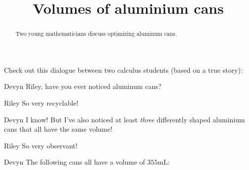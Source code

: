 \documentclass{ximera}
\title[Break-Ground:]{Volumes of aluminium cans}
\begin{document}
\begin{abstract}
Two young mathematicians discuss optimizing aluminum cans.
\end{abstract}
\maketitle

Check out this dialogue between two calculus students (based on a true
story):

\begin{dialogue}
\item[Devyn] Riley, have you ever noticed aluminum cans?
\item[Riley] So very recyclable! 
\item[Devyn] I know! But I've also noticed at least \textit{three}
  differently shaped aluminium cans that all have the same volume!
\item[Riley] So very observant! 
\item[Devyn] The following cans all have a volume of $355\mathrm{mL}$:
  
\end{dialogue}


\end{document}
